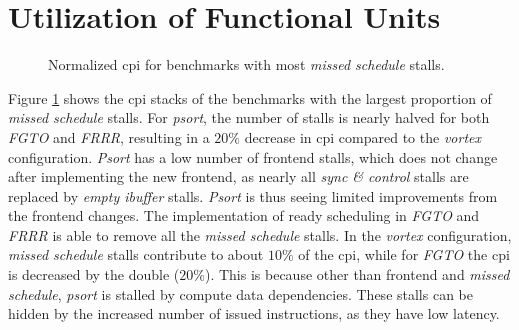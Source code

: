 \section{Utilization of Functional Units}

\begin{figure}
    \centering
    \caption[Normalized \acrshort{cpi} for benchmarks with most missed schedule opportunities.]{Normalized \acrshort{cpi} for benchmarks with most \textit{missed schedule} stalls.}
    \label{fig:cpi_missed_schedule}
\end{figure}

Figure \ref{fig:cpi_missed_schedule} shows the \acrshort{cpi} stacks of the benchmarks with the largest proportion of \textit{missed schedule} stalls. For \textit{psort}, the number of stalls is nearly halved for both \textit{FGTO} and \textit{FRRR}, resulting in a $20\%$ decrease in \acrshort{cpi} compared to the \textit{\Gls{vortex}} configuration. \textit{Psort} has a low number of frontend stalls, which does not change after implementing the new frontend, as nearly all \textit{sync \& control} stalls are replaced by \textit{empty ibuffer} stalls. \textit{Psort} is thus seeing limited improvements from the frontend changes. The implementation of ready scheduling in \textit{FGTO} and \textit{FRRR} is able to remove all the \textit{missed schedule} stalls. In the \textit{\Gls{vortex}} configuration, \textit{missed schedule} stalls contribute to about $10\%$ of the \acrshort{cpi}, while for \textit{FGTO} the \acrshort{cpi} is decreased by the double ($20\%$). This is because other than frontend and \textit{missed schedule}, \textit{psort} is stalled by compute data dependencies. These stalls can be hidden by the increased number of issued instructions, as they have low latency.

